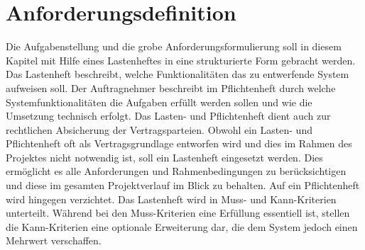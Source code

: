 \documentclass[ a4paper,
                oneside,
                toc=bibliography,
                toc=listof
                ]{scrbook}
\begin{document}
	\newpage
	
	\chapter{Anforderungsdefinition}
	\label{chap:Anforderungsdefinition}
	Die Aufgabenstellung und die grobe Anforderungsformulierung soll in diesem Kapitel mit Hilfe eines Lastenheftes in eine strukturierte Form gebracht werden. Das Lastenheft beschreibt, welche Funktionalitäten das zu entwerfende System aufweisen soll. Der Auftragnehmer beschreibt im Pflichtenheft durch welche Systemfunktionalitäten die Aufgaben erfüllt werden sollen und wie die Umsetzung technisch erfolgt. Das Lasten- und Pflichtenheft dient auch zur rechtlichen Absicherung der Vertragsparteien. Obwohl ein Lasten- und Pflichtenheft oft als Vertragsgrundlage entworfen wird und dies im Rahmen des Projektes nicht notwendig ist, soll ein Lastenheft eingesetzt werden. Dies ermöglicht es alle Anforderungen und Rahmenbedingungen zu berücksichtigen und diese im gesamten Projektverlauf im Blick zu behalten. Auf ein Pflichtenheft wird hingegen verzichtet. \cite{SoftwaretechnikBroy}
	Das Lastenheft wird in Muss- und Kann-Kriterien unterteilt. Während bei den Muss-Kriterien eine Erfüllung essentiell ist, stellen die Kann-Kriterien eine optionale Erweiterung dar, die dem System jedoch einen Mehrwert verschaffen.\\
\end{document}
